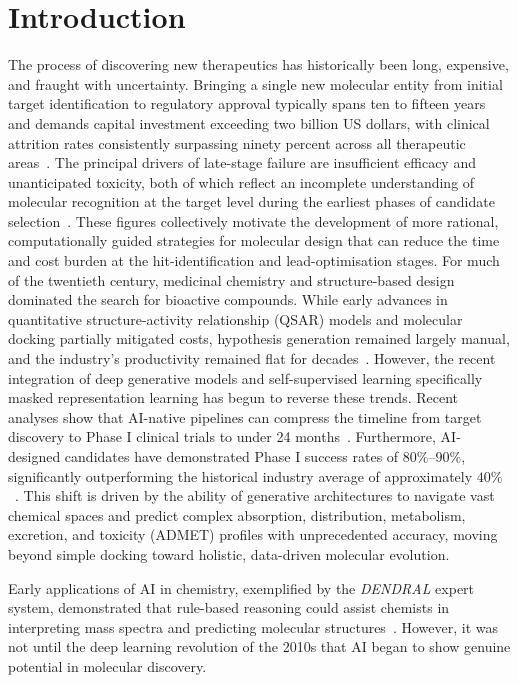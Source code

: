 \documentclass[a4paper,12pt]{article}
\begin{document}
\section{Introduction}
The process of discovering new therapeutics has historically been long, expensive, and fraught with uncertainty. Bringing a single new molecular entity from initial target identification to
regulatory approval typically spans ten to fifteen years and demands capital
investment exceeding two billion US dollars, with clinical attrition rates
consistently surpassing ninety percent across all therapeutic
areas~\cite{Paul2010, Pammolli2011}. The principal drivers of late-stage failure are insufficient efficacy and
unanticipated toxicity, both of which reflect an incomplete understanding of
molecular recognition at the target level during the earliest phases of
candidate selection~\cite{Paul2010}.
These figures collectively motivate the development of more rational,
computationally guided strategies for molecular design that can reduce the
time and cost burden at the hit-identification and lead-optimisation stages. For much of the twentieth century, medicinal chemistry and structure-based design dominated the search for bioactive compounds. While early advances in quantitative structure-activity relationship (QSAR) models and molecular docking partially mitigated costs, hypothesis generation remained largely manual, and the industry's productivity remained flat for decades~\cite{Lindsay1980}. However, the recent integration of deep generative models and self-supervised learning specifically masked representation learning has begun to reverse these trends. Recent analyses show that AI-native pipelines can compress the timeline from target discovery to Phase I clinical trials to under 24 months~\cite{Zhou2024}. Furthermore, AI-designed candidates have demonstrated Phase I success rates of $80\%$--$90\%$, significantly outperforming the historical industry average of approximately $40\%$~\cite{Jayatunga2024}. This shift is driven by the ability of generative architectures to navigate vast chemical spaces and predict complex absorption, distribution, metabolism, excretion, and toxicity (ADMET) profiles with unprecedented accuracy, moving beyond simple docking toward holistic, data-driven molecular evolution.


Early applications of AI in chemistry, exemplified by the \textit{DENDRAL} expert system, demonstrated that rule-based reasoning could assist chemists in interpreting mass spectra and predicting molecular structures~\cite{Lindsay1980}. However, it was not until the deep learning revolution of the 2010s that AI began to show genuine potential in molecular discovery. 
\end{document}
